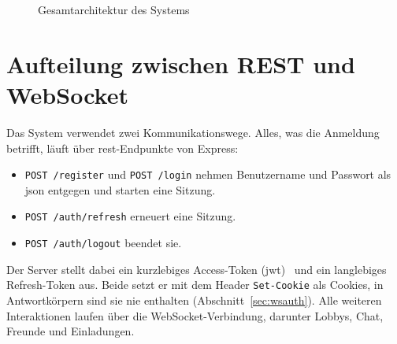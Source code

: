 \begin{figure}[ht]
{}
\caption{Gesamtarchitektur des Systems}
\label{fig:architektur}
\end{figure}

\section{Aufteilung zwischen REST und WebSocket}
\label{sec:restws}

Das System verwendet zwei Kommunikationswege. Alles, was die Anmeldung betrifft, läuft über \gls{rest}-Endpunkte von Express:
\begin{itemize}
  \item \texttt{POST /register} und \texttt{POST /login} nehmen Benutzername und Passwort als \gls{json} entgegen und starten eine Sitzung.
  \item \texttt{POST /auth/refresh} erneuert eine Sitzung.
  \item \texttt{POST /auth/logout} beendet sie.
\end{itemize}
Der Server stellt dabei ein kurzlebiges Access-Token (\gls{jwt})~\cite{RFC7519} und ein langlebiges Refresh-Token aus. Beide setzt er mit dem Header \texttt{Set-Cookie} als Cookies, in Antwortkörpern sind sie nie enthalten (Abschnitt~\ref{sec:wsauth}). Alle weiteren Interaktionen laufen über die WebSocket-Verbindung, darunter Lobbys, Chat, Freunde und Einladungen.

